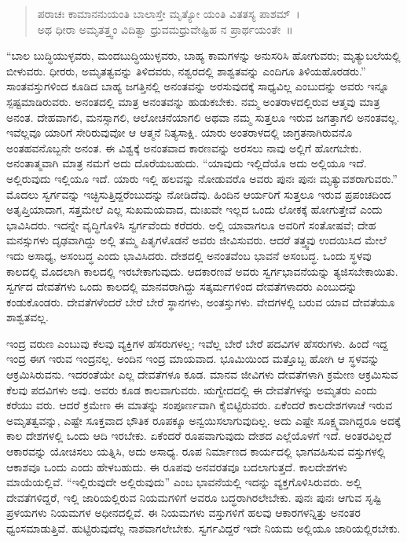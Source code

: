 \begin{verse}
ಪರಾಚಃ ಕಾಮಾನನುಯಂತಿ ಬಾಲಾಸ್ತೇ ಮೃತ್ಯೋ ಯಂತಿ ವಿತತಸ್ಯ ಪಾಶಮ್​~।\\ಅಥ ಧೀರಾ ಅಮೃತತ್ತ್ವಂ ವಿದಿತ್ವಾ ಧ್ರುವಮಧ್ರುವೇಷ್ಟಿಹ ನ ಪ್ರಾರ್ಥಯಂತೇ~॥
\end{verse}

“ಬಾಲ ಬುದ್ಧಿಯುಳ್ಳವರು, ಮಂದಬುದ್ಧಿಯುಳ್ಳವರು, ಬಾಹ್ಯ ಕಾಮಗಳನ್ನು ಅನುಸರಿಸಿ ಹೋಗುವರು; ಮೃತ್ಯುಬಲೆಯಲ್ಲಿ ಬೀಳುವರು. ಧೀರರು, ಅಮೃತತ್ವವನ್ನು ತಿಳಿದವರು, ನಶ್ವರದಲ್ಲಿ ಶಾಶ್ವತವನ್ನು ಎಂದಿಗೂ ತಿಳಿಯಹೊರಡರು.” ಸಾಂತವಸ್ತುಗಳಿಂದ ಕೂಡಿದ ಬಾಹ್ಯ ಜಗತ್ತಿನಲ್ಲಿ ಅನಂತವನ್ನು ಅರಸುವುದಕ್ಕೆ ಸಾಧ್ಯವಿಲ್ಲ ಎಂಬುದನ್ನು ಅವರು ಇನ್ನೂ ಸ್ಪಷ್ಟಮಾಡಿರುವರು. ಅನಂತದಲ್ಲಿ ಮಾತ್ರ ಅನಂತವನ್ನು ಹುಡುಕಬೇಕು. ನಮ್ಮ ಅಂತರಾಳದಲ್ಲಿರುವ ಆತ್ಮವು ಮಾತ್ರ ಅನಂತ. ದೇಹವಾಗಲಿ, ಮನಸ್ಸಾಗಲಿ, ಆಲೋಚನೆಯಾಗಲಿ ಅಥವಾ ನಮ್ಮ ಸುತ್ತಲೂ ಇರುವ ಜಗತ್ತಾಗಲಿ ಅನಂತವಲ್ಲ. ಇವೆಲ್ಲವೂ ಯಾರಿಗೆ ಸೇರಿರುವುವೋ ಆ ಆತ್ಮನೆ ನಿತ್ಯಸಾಕ್ಷಿ. ಯಾರು ಅಂತರಾಳದಲ್ಲಿ ಜಾಗ್ರತನಾಗಿರುವನೊ ಅಂತಹವನೊಬ್ಬನೇ ಅನಂತ. ಈ ವಿಶ್ವಕ್ಕೆ ಅನಂತವಾದ ಕಾರಣವನ್ನು ಅರಸಲು ನಾವು ಅಲ್ಲಿಗೆ ಹೋಗಬೇಕು. ಅನಂತಾತ್ಮವಾಗಿ ಮಾತ್ರ ನಮಗೆ ಅದು ದೊರೆಯಬಹುದು. “ಯಾವುದು ಇಲ್ಲಿದೆಯೊ ಅದು ಅಲ್ಲಿಯೂ ಇದೆ. ಅಲ್ಲಿರುವುದು ಇಲ್ಲಿಯೂ ಇದೆ. ಯಾರು ಇಲ್ಲಿ ಹಲವನ್ನು ನೋಡುವರೊ ಅವರು ಪುನಃ ಪುನಃ ಮೃತ್ಯುವಶರಾಗುವರು.” ಮೊದಲು ಸ್ವರ್ಗವನ್ನು ಇಚ್ಛಿಸುತ್ತಿದ್ದರೆಂಬುದನ್ನು ನೋಡಿದೆವು. ಹಿಂದಿನ ಆರ್ಯರಿಗೆ ಸುತ್ತಲೂ ಇರುವ ಪ್ರಪಂಚದಿಂದ ಅತೃಪ್ತಿಯಾದಾಗ, ಸತ್ತಮೇಲೆ ಎಲ್ಲ ಸುಖಮಯವಾದ, ದುಃಖವೇ ಇಲ್ಲದ ಒಂದು ಲೋಕಕ್ಕೆ ಹೋಗುತ್ತೇವೆ ಎಂದು ಭಾವಿಸಿದರು. ಇದನ್ನೇ ವೃದ್ಧಿಗೊಳಿಸಿ ಸ್ವರ್ಗವೆಂದು ಕರೆದರು. ಅಲ್ಲಿ ಯಾವಾಗಲೂ ಅವರಿಗೆ ಸಂತೋಷವೆ; ದೇಹ ಮನಸ್ಸುಗಳು ದೃಢವಾಗಿದ್ದು ಅಲ್ಲಿ ತಮ್ಮ ಪಿತೃಗಳೊಡನೆ ಅವರು ಜೀವಿಸುವರು. ಆದರೆ ತತ್ತ್ವವು ಉದಯಿಸಿದ ಮೇಲೆ ಇದು ಅಸಾಧ್ಯ, ಅಸಂಬದ್ಧ ಎಂದು ಭಾವಿಸಿದರು. ದೇಶದಲ್ಲಿ ಅನಂತವೆಂಬ ಭಾವನೆ ಅಸಂಬದ್ಧ. ಒಂದು ಸ್ಥಳವು ಕಾಲದಲ್ಲಿ ಮೊದಲಾಗಿ ಕಾಲದಲ್ಲಿ ಇರಬೇಕಾಗುವುದು. ಆದಕಾರಣವೆ ಅವರು ಸ್ವರ್ಗಭಾವನೆಯನ್ನು ತ್ಯಜಿಸಬೇಕಾಯಿತು. ಸ್ವರ್ಗದ ದೇವತೆಗಳು ಒಂದು ಕಾಲದಲ್ಲಿ ಮಾನವರಾಗಿದ್ದು ಸತ್ಕರ್ಮಗಳಿಂದ ದೇವತೆಗಳಾದರು ಎಂಬುದನ್ನು ಕಂಡುಕೊಂಡರು. ದೇವತೆಗಳೆಂದರೆ ಬೇರೆ ಬೇರೆ ಸ್ಥಾನಗಳು, ಅಂತಸ್ತುಗಳು. ವೇದಗಳಲ್ಲಿ ಬರುವ ಯಾವ ದೇವತೆಯೂ ಶಾಶ್ವತವಲ್ಲ.

ಇಂದ್ರ ವರುಣ ಎಂಬುವು ಕೆಲವು ವ್ಯಕ್ತಿಗಳ ಹೆಸರುಗಳಲ್ಲ; ಇವೆಲ್ಲ ಬೇರೆ ಬೇರೆ ಪದವಿಗಳ ಹೆಸರುಗಳು. ಹಿಂದೆ ಇದ್ದ ಇಂದ್ರ ಈಗ ಇರುವ ಇಂದ್ರನಲ್ಲ. ಅಂದಿನ ಇಂದ್ರ ಮಾಯವಾದ. ಭೂಮಿಯಿಂದ ಮತ್ತೊಬ್ಬ ಹೋಗಿ ಆ ಸ್ಥಳವನ್ನು ಆಕ್ರಮಿಸಿರುವನು. ಇದರಂತೆಯೇ ಎಲ್ಲ ದೇವತೆಗಳೂ ಕೂಡ. ಮಾನವ ಜೀವಿಗಳು ದೇವತೆಗಳಾಗಿ ಕ್ರಮೇಣ ಆಕ್ರಮಿಸುವ ಕೆಲವು ಪದವಿಗಳು ಅವು. ಅವರು ಕೂಡ ಕಾಲವಾಗುವರು. ಋಗ್ವೇದದಲ್ಲಿ ಈ ದೇವತೆಗಳನ್ನು ಅಮೃತರು ಎಂದು ಕರೆಯು ವರು. ಆದರೆ ಕ್ರಮೇಣ ಈ ಮಾತನ್ನು ಸಂಪೂರ್ಣವಾಗಿ ಕೈಬಿಟ್ಟಿರುವರು. ಏಕೆಂದರೆ ಕಾಲದೇಶಗಳಾಚೆ ಇರುವ ಅಮೃತತ್ವವನ್ನು, ಎಷ್ಟೇ ಸೂಕ್ತವಾದ ಭೌತಿಕ ರೂಪಕ್ಕೂ ಅನ್ವಯಿಸಲಾಗುವುದಿಲ್ಲ. ಅದು ಎಷ್ಟೇ ಸೂಕ್ಷ್ಮವಾಗಿದ್ದರೂ ಅದಕ್ಕೆ ಕಾಲ ದೇಶಗಳಲ್ಲಿ ಒಂದು ಆದಿ ಇರಬೇಕು. ಏಕೆಂದರೆ ರೂಪವಾಗುವುದು ದೇಶದ ಎಲ್ಲೆಯೊಳಗೆ ಇದೆ. ಅಂತರವಿಲ್ಲದೆ ಆಕಾರವನ್ನು ಯೋಚಿಸಲು ಯತ್ನಿಸಿ, ಅದು ಅಸಾಧ್ಯ. ರೂಪ ನಿರ್ಮಾಣದ ಕಾರ್ಯದಲ್ಲಿ ಭಾಗವಹಿಸುವ ವಸ್ತುಗಳಲ್ಲಿ ಆಕಾಶವೂ ಒಂದು ಎಂದು ಹೇಳಬಹುದು. ಈ ರೂಪವು ಅನವರತವೂ ಬದಲಾಗುತ್ತದೆ. ಕಾಲದೇಶಗಳು ಮಾಯೆಯಲ್ಲಿವೆ. “ಇಲ್ಲಿರುವುದೇ ಅಲ್ಲಿರುವುದು” ಎಂಬ ಭಾವನೆಯಲ್ಲಿ ಇದನ್ನು ವ್ಯಕ್ತಗೊಳಿಸಿರುವರು. ಅಲ್ಲಿ ದೇವತೆಗಳಿದ್ದರೆ, ಇಲ್ಲಿ ಜಾರಿಯಲ್ಲಿರುವ ನಿಯಮಗಳಿಗೆ ಅವರೂ ಬದ್ಧರಾಗಿರಲೇಬೇಕು. ಪುನಃ ಪುನಃ ಆಗುವ ಸೃಷ್ಟಿ ಪ್ರಳಯಗಳು ನಿಯಮಗಳ ಅಧೀನದಲ್ಲಿವೆ. ಈ ನಿಯಮಗಳು ವಸ್ತುಗಳಿಗೆ ಹಲವು ಆಕಾರಗಳನ್ನಿತ್ತು ಅನಂತರ ಧ್ವಂಸಮಾಡುತ್ತಿವೆ. ಹುಟ್ಟಿರುವುದೆಲ್ಲ ನಾಶವಾಗಲೇಬೇಕು. ಸ್ವರ್ಗವಿದ್ದರೆ ಇದೇ ನಿಯಮ ಅಲ್ಲಿಯೂ ಜಾರಿಯಲ್ಲಿರಬೇಕು.

